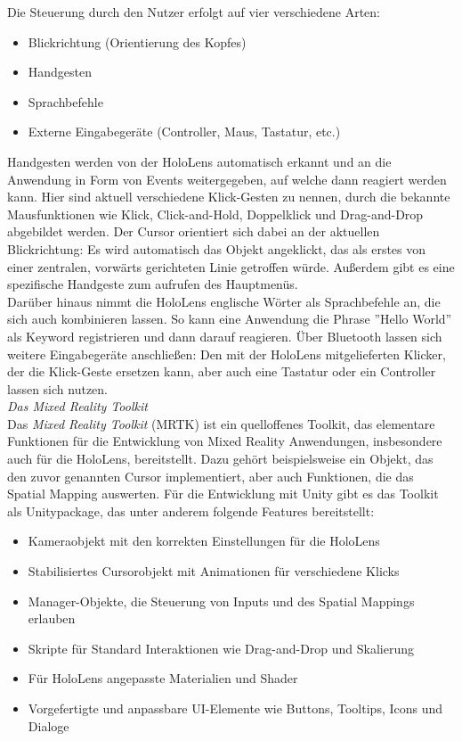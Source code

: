 Die Steuerung durch den Nutzer erfolgt auf vier verschiedene Arten:
\begin{itemize}[topsep=-2px]
	\setlength{\itemsep}{-1pt}
	\singlespacing
	\item Blickrichtung (Orientierung des Kopfes)
	\item Handgesten
	\item Sprachbefehle
	\item Externe Eingabegeräte (Controller, Maus, Tastatur, etc.)
\end{itemize}
\vspace{6px}

Handgesten werden von der HoloLens automatisch erkannt und an die Anwendung in Form von Events weitergegeben, auf welche dann reagiert werden kann. Hier sind aktuell verschiedene Klick-Gesten zu nennen, durch die bekannte Mausfunktionen wie Klick, Click-and-Hold, Doppelklick und Drag-and-Drop abgebildet werden. Der Cursor orientiert sich dabei an der aktuellen Blickrichtung: Es wird automatisch das Objekt angeklickt, das als erstes von einer zentralen, vorwärts gerichteten Linie getroffen würde. Außerdem gibt es eine spezifische Handgeste zum aufrufen des Hauptmenüs.\\

Darüber hinaus nimmt die HoloLens englische Wörter als Sprachbefehle an, die sich auch kombinieren lassen. So kann eine Anwendung die Phrase ''Hello World'' als Keyword registrieren und dann darauf reagieren. Über Bluetooth lassen sich weitere Eingabegeräte anschließen: Den mit der HoloLens mitgelieferten Klicker, der die Klick-Geste ersetzen kann, aber auch eine Tastatur oder ein Controller lassen sich nutzen.\\

\vspace{4px}
\textit{Das Mixed Reality Toolkit}\\
Das \textit{Mixed Reality Toolkit} (MRTK) ist ein quelloffenes Toolkit, das elementare Funktionen für die Entwicklung von Mixed Reality Anwendungen, insbesondere auch für die HoloLens, bereitstellt. Dazu gehört beispielsweise ein Objekt, das den zuvor genannten Cursor implementiert, aber auch Funktionen, die das Spatial Mapping auswerten. Für die Entwicklung mit Unity gibt es das Toolkit als Unitypackage, das unter anderem folgende Features bereitstellt:

\begin{itemize}[topsep=-2px]
	\setlength{\itemsep}{-1pt}
	\singlespacing
	\item Kameraobjekt mit den korrekten Einstellungen für die HoloLens
	\item Stabilisiertes Cursorobjekt mit Animationen für verschiedene Klicks
	\item Manager-Objekte, die Steuerung von Inputs und des Spatial Mappings erlauben
	\item Skripte für Standard Interaktionen wie Drag-and-Drop und Skalierung
	\item Für HoloLens angepasste Materialien und Shader
	\item Vorgefertigte und anpassbare UI-Elemente wie Buttons, Tooltips, Icons und Dialoge
\end{itemize}
\vspace{6px}

